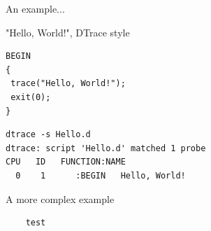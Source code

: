 \documentclass{beamer}
\begin{document}
\begin{frame}
    An example...
\end{frame}

\begin{frame}[fragile]
    "Hello, World!", DTrace style
    \begin{example}
    \begin{lstlisting}
BEGIN 
{ 
 trace("Hello, World!"); 
 exit(0); 
}
    \end{lstlisting}
    \end{example}
    \begin{example}
    \begin{verbatim}
dtrace -s Hello.d 
dtrace: script 'Hello.d' matched 1 probe
CPU   ID   FUNCTION:NAME
  0    1      :BEGIN   Hello, World!
    \end{verbatim}
    \end{example}
\end{frame}

\begin{frame}
    A more complex example
    \begin{example}
    \begin{lstlisting}
    test
    \end{lstlisting}
    \end{example}
\end{frame}
\end{document}
